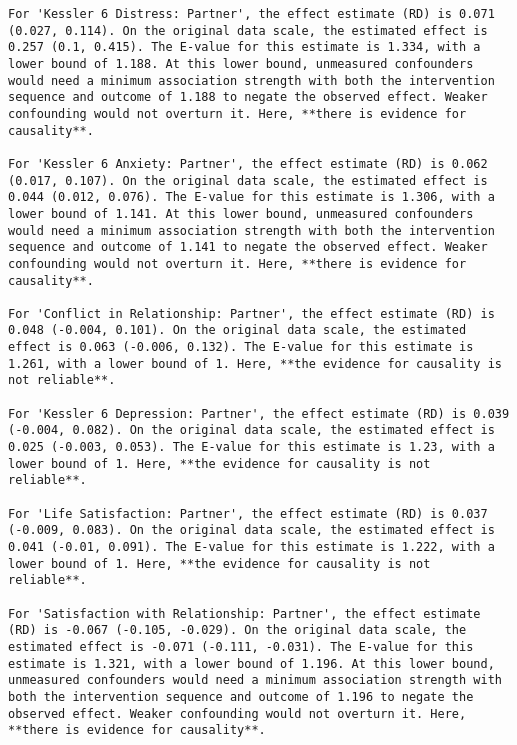 \documentclass[
  singlecolumn]{article}
\begin{document}
\begin{verbatim}
For 'Kessler 6 Distress: Partner', the effect estimate (RD) is 0.071 (0.027, 0.114). On the original data scale, the estimated effect is 0.257 (0.1, 0.415). The E-value for this estimate is 1.334, with a lower bound of 1.188. At this lower bound, unmeasured confounders would need a minimum association strength with both the intervention sequence and outcome of 1.188 to negate the observed effect. Weaker confounding would not overturn it. Here, **there is evidence for causality**.

For 'Kessler 6 Anxiety: Partner', the effect estimate (RD) is 0.062 (0.017, 0.107). On the original data scale, the estimated effect is 0.044 (0.012, 0.076). The E-value for this estimate is 1.306, with a lower bound of 1.141. At this lower bound, unmeasured confounders would need a minimum association strength with both the intervention sequence and outcome of 1.141 to negate the observed effect. Weaker confounding would not overturn it. Here, **there is evidence for causality**.

For 'Conflict in Relationship: Partner', the effect estimate (RD) is 0.048 (-0.004, 0.101). On the original data scale, the estimated effect is 0.063 (-0.006, 0.132). The E-value for this estimate is 1.261, with a lower bound of 1. Here, **the evidence for causality is not reliable**.

For 'Kessler 6 Depression: Partner', the effect estimate (RD) is 0.039 (-0.004, 0.082). On the original data scale, the estimated effect is 0.025 (-0.003, 0.053). The E-value for this estimate is 1.23, with a lower bound of 1. Here, **the evidence for causality is not reliable**.

For 'Life Satisfaction: Partner', the effect estimate (RD) is 0.037 (-0.009, 0.083). On the original data scale, the estimated effect is 0.041 (-0.01, 0.091). The E-value for this estimate is 1.222, with a lower bound of 1. Here, **the evidence for causality is not reliable**.

For 'Satisfaction with Relationship: Partner', the effect estimate (RD) is -0.067 (-0.105, -0.029). On the original data scale, the estimated effect is -0.071 (-0.111, -0.031). The E-value for this estimate is 1.321, with a lower bound of 1.196. At this lower bound, unmeasured confounders would need a minimum association strength with both the intervention sequence and outcome of 1.196 to negate the observed effect. Weaker confounding would not overturn it. Here, **there is evidence for causality**.


\end{verbatim}
\end{document}
